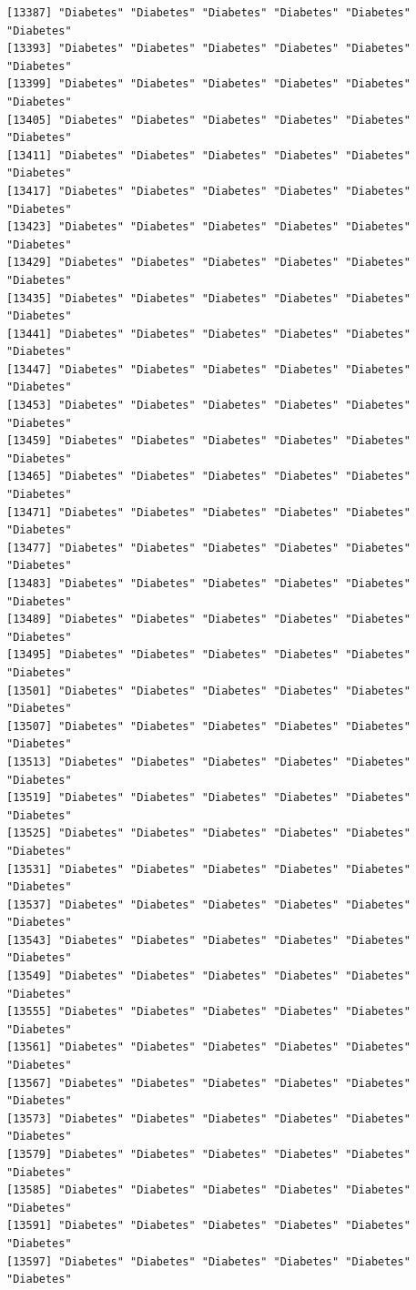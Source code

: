 \documentclass[
  letterpaper,
  DIV=11,
  numbers=noendperiod]{scrartcl}
\begin{document}
\begin{verbatim}
[13387] "Diabetes" "Diabetes" "Diabetes" "Diabetes" "Diabetes" "Diabetes"
[13393] "Diabetes" "Diabetes" "Diabetes" "Diabetes" "Diabetes" "Diabetes"
[13399] "Diabetes" "Diabetes" "Diabetes" "Diabetes" "Diabetes" "Diabetes"
[13405] "Diabetes" "Diabetes" "Diabetes" "Diabetes" "Diabetes" "Diabetes"
[13411] "Diabetes" "Diabetes" "Diabetes" "Diabetes" "Diabetes" "Diabetes"
[13417] "Diabetes" "Diabetes" "Diabetes" "Diabetes" "Diabetes" "Diabetes"
[13423] "Diabetes" "Diabetes" "Diabetes" "Diabetes" "Diabetes" "Diabetes"
[13429] "Diabetes" "Diabetes" "Diabetes" "Diabetes" "Diabetes" "Diabetes"
[13435] "Diabetes" "Diabetes" "Diabetes" "Diabetes" "Diabetes" "Diabetes"
[13441] "Diabetes" "Diabetes" "Diabetes" "Diabetes" "Diabetes" "Diabetes"
[13447] "Diabetes" "Diabetes" "Diabetes" "Diabetes" "Diabetes" "Diabetes"
[13453] "Diabetes" "Diabetes" "Diabetes" "Diabetes" "Diabetes" "Diabetes"
[13459] "Diabetes" "Diabetes" "Diabetes" "Diabetes" "Diabetes" "Diabetes"
[13465] "Diabetes" "Diabetes" "Diabetes" "Diabetes" "Diabetes" "Diabetes"
[13471] "Diabetes" "Diabetes" "Diabetes" "Diabetes" "Diabetes" "Diabetes"
[13477] "Diabetes" "Diabetes" "Diabetes" "Diabetes" "Diabetes" "Diabetes"
[13483] "Diabetes" "Diabetes" "Diabetes" "Diabetes" "Diabetes" "Diabetes"
[13489] "Diabetes" "Diabetes" "Diabetes" "Diabetes" "Diabetes" "Diabetes"
[13495] "Diabetes" "Diabetes" "Diabetes" "Diabetes" "Diabetes" "Diabetes"
[13501] "Diabetes" "Diabetes" "Diabetes" "Diabetes" "Diabetes" "Diabetes"
[13507] "Diabetes" "Diabetes" "Diabetes" "Diabetes" "Diabetes" "Diabetes"
[13513] "Diabetes" "Diabetes" "Diabetes" "Diabetes" "Diabetes" "Diabetes"
[13519] "Diabetes" "Diabetes" "Diabetes" "Diabetes" "Diabetes" "Diabetes"
[13525] "Diabetes" "Diabetes" "Diabetes" "Diabetes" "Diabetes" "Diabetes"
[13531] "Diabetes" "Diabetes" "Diabetes" "Diabetes" "Diabetes" "Diabetes"
[13537] "Diabetes" "Diabetes" "Diabetes" "Diabetes" "Diabetes" "Diabetes"
[13543] "Diabetes" "Diabetes" "Diabetes" "Diabetes" "Diabetes" "Diabetes"
[13549] "Diabetes" "Diabetes" "Diabetes" "Diabetes" "Diabetes" "Diabetes"
[13555] "Diabetes" "Diabetes" "Diabetes" "Diabetes" "Diabetes" "Diabetes"
[13561] "Diabetes" "Diabetes" "Diabetes" "Diabetes" "Diabetes" "Diabetes"
[13567] "Diabetes" "Diabetes" "Diabetes" "Diabetes" "Diabetes" "Diabetes"
[13573] "Diabetes" "Diabetes" "Diabetes" "Diabetes" "Diabetes" "Diabetes"
[13579] "Diabetes" "Diabetes" "Diabetes" "Diabetes" "Diabetes" "Diabetes"
[13585] "Diabetes" "Diabetes" "Diabetes" "Diabetes" "Diabetes" "Diabetes"
[13591] "Diabetes" "Diabetes" "Diabetes" "Diabetes" "Diabetes" "Diabetes"
[13597] "Diabetes" "Diabetes" "Diabetes" "Diabetes" "Diabetes" "Diabetes"

\end{verbatim}
\end{document}

